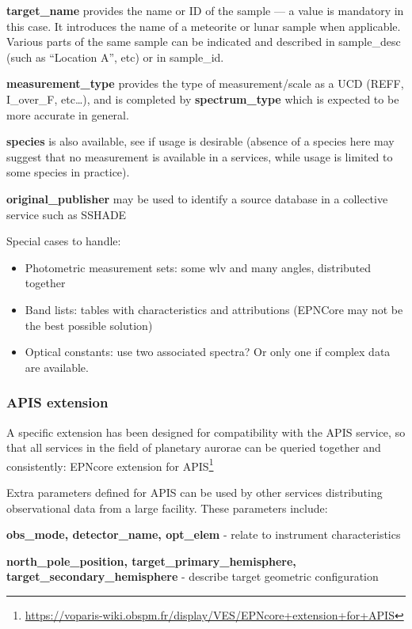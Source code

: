 \documentclass[11pt,a4paper]{ivoa}
\begin{document}
\textbf{target\_name }provides the name or ID of the sample — a value is mandatory in this case. It introduces the name of a meteorite or lunar sample when applicable. Various parts of the same sample can be indicated and described in sample\_desc (such as ``Location A'', etc) or in sample\_id.

\textbf{measurement\_type} provides the type of measurement/scale as a UCD (REFF, I\_over\_F, etc…), and is completed by \textbf{spectrum\_type} which is expected to be more accurate in general.

\textbf{species} is also available, see if usage is desirable (absence of a species here may suggest that no measurement is available in a services, while usage is limited to some species in practice).

\textbf{original\_publisher }may be used to identify a source database in a collective service such as SSHADE


Special cases to handle:

\begin{itemize}
\item Photometric measurement sets: some wlv and many angles, distributed together
\item Band lists: tables with characteristics and attributions (EPNCore may not be the best possible solution)
\item Optical constants: use two associated spectra? Or only one if complex data are available.
\end{itemize}

\subsubsection{APIS extension}

A specific extension has been designed for compatibility with the APIS service, so that all services in the field of planetary aurorae can be queried together and consistently: EPNcore extension for APIS\footnote{\url{https://voparis-wiki.obspm.fr/display/VES/EPNcore+extension+for+APIS}}

Extra parameters defined for APIS can be used by other services distributing observational data from a large facility. These parameters include:

\textbf{obs\_mode, detector\_name, opt\_elem }- relate to instrument characteristics

\textbf{north\_pole\_position, target\_primary\_hemisphere, target\_secondary\_hemisphere} - describe target geometric configuration
\end{document}

